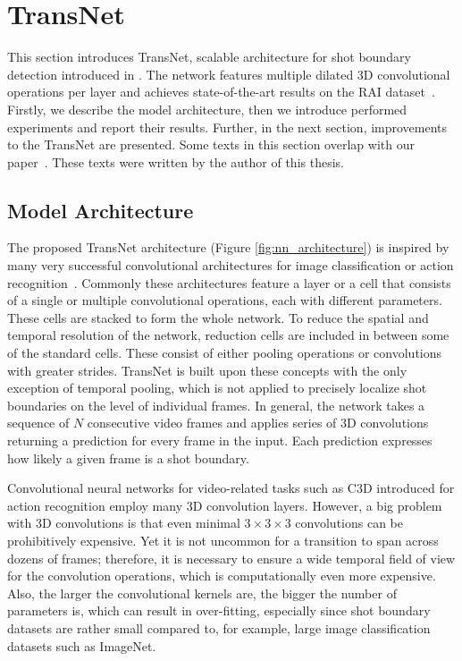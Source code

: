 \clearpage
\section{TransNet}\label{sec:transnetv1}
This section introduces TransNet, scalable architecture for shot boundary detection introduced in \cite{soucek2019transnet,LokocMM2019}. The network features multiple dilated 3D convolutional operations per layer and achieves state-of-the-art results on the RAI data\-set~\cite{Baraldi15}. Firstly, we describe the model architecture, then we introduce performed experiments and report their results. Further, in the next section, improvements to the TransNet are presented. Some texts in this section overlap with our paper~\cite{soucek2019transnet}. These texts were written by the author of this thesis.


\subsection{Model Architecture}

The proposed TransNet architecture (Figure \ref{fig:nn_architecture}) is inspired by many very successful convolutional architectures for image classification \cite{AlexNet} or action recognition~\cite{Tran_2015_C3D}. Commonly these architectures feature a layer or a cell that consists of a single or multiple convolutional operations, each with different parameters. These cells are stacked to form the whole network. To reduce the spatial and temporal resolution of the network, reduction cells are included in between some of the standard cells. These consist of either pooling operations or convolutions with greater strides. TransNet is built upon these concepts with the only exception of temporal pooling, which is not applied to precisely localize shot boundaries on the level of individual frames. In general, the network takes a sequence of $N$ consecutive video frames and applies series of 3D convolutions returning a prediction for every frame in the input. Each prediction expresses how likely a given frame is a shot boundary.

Convolutional neural networks for video-related tasks such as C3D \cite{Tran_2015_C3D} introduced for action recognition employ many 3D convolution layers. However, a big problem with 3D convolutions is that even minimal $3\times 3\times 3$ convolutions can be prohibitively expensive. Yet it is not uncommon for a transition to span across dozens of frames; therefore, it is necessary to ensure a wide temporal field of view for the convolution operations, which is computationally even more expensive. Also, the larger the convolutional kernels are, the bigger the number of parameters is, which can result in over-fitting, especially since shot boundary datasets are rather small compared to, for example, large image classification datasets such as ImageNet.

